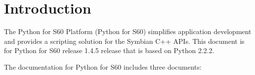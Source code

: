 %
%
%

\chapter{Introduction}
\label{intro}

The Python for S60 Platform (Python for S60) simplifies application development 
and provides a scripting solution for the Symbian C++ APIs. This document is for 
Python for S60 release 1.4.5 release that is based on Python 2.2.2.

The documentation for Python for S60 includes three documents:

